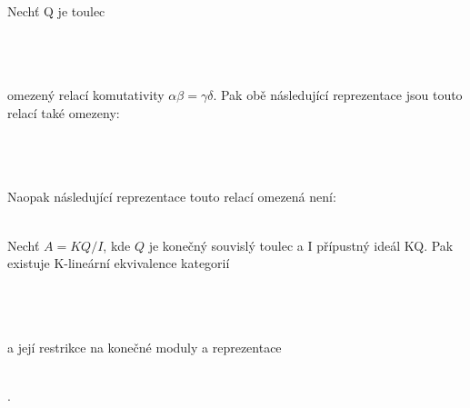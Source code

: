     \begin{pr}
      Nechť Q je toulec \\
      \centerline{}\\\\\\ omezený relací komutativity $\alpha\beta=\gamma\delta$. Pak obě 
      následující reprezentace jsou touto relací také omezeny: \\\\
      \centerline{ 
        }\\\\
      Naopak následující reprezentace touto relací omezená není: \\\\
      \centerline{}
      
    \end{pr}
    
    \begin{thm}\label{ekvivalence-rep-a-mod}
      Nechť $A=KQ/I$, kde $Q$ je konečný souvislý toulec a I přípustný ideál KQ. 
      Pak existuje K-lineární ekvivalence kategorií \\\\
      \centerline{}\\\\
      a její restrikce na konečné moduly a reprezentace \\\\
      \centerline{.}
    \end{thm}
    
